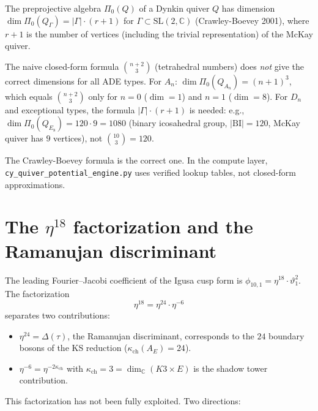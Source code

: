\documentclass[11pt]{article}
\newcommand{\C}{\mathbb{C}}
\begin{document}
The preprojective algebra $\Pi_0(Q)$ of a Dynkin quiver $Q$ has dimension $\dim \Pi_0(Q_\Gamma) = |\Gamma| \cdot (r+1)$ for $\Gamma \subset \mathrm{SL}(2,\C)$ (Crawley-Boevey 2001), where $r+1$ is the number of vertices (including the trivial representation) of the McKay quiver.

\begin{warning}
The naive closed-form formula $\binom{n+2}{3}$ (tetrahedral numbers) does \emph{not} give the correct dimensions for all ADE types. For $A_n$: $\dim \Pi_0(Q_{A_n}) = (n+1)^3$, which equals $\binom{n+2}{3}$ only for $n = 0$ ($\dim = 1$) and $n = 1$ ($\dim = 8$). For $D_n$ and exceptional types, the formula $|\Gamma| \cdot (r+1)$ is needed: e.g., $\dim \Pi_0(Q_{E_8}) = 120 \cdot 9 = 1080$ (binary icosahedral group, $|\mathrm{BI}| = 120$, McKay quiver has $9$ vertices), not $\binom{10}{3} = 120$.

The Crawley-Boevey formula is the correct one. In the compute layer, \texttt{cy\_quiver\_potential\_engine.py} uses verified lookup tables, not closed-form approximations.
\end{warning}


\section{The $\eta^{18}$ factorization and the Ramanujan discriminant}
\label{sec:eta-18-factorization}

The leading Fourier--Jacobi coefficient of the Igusa cusp form is $\phi_{10,1} = \eta^{18} \cdot \vartheta_1^2$. The factorization
\[
 \eta^{18} = \eta^{24} \cdot \eta^{-6}
\]
separates two contributions:
\begin{itemize}
 \item $\eta^{24} = \Delta(\tau)$, the Ramanujan discriminant, corresponds to the $24$ boundary bosons of the KS reduction ($\kappa_{\mathrm{ch}}(A_E) = 24$).
 \item $\eta^{-6} = \eta^{-2\kappa_{\mathrm{ch}}}$ with $\kappa_{\mathrm{ch}} = 3 = \dim_\C(K3 \times E)$ is the shadow tower contribution.
\end{itemize}

This factorization has not been fully exploited. Two directions:
\end{document}
